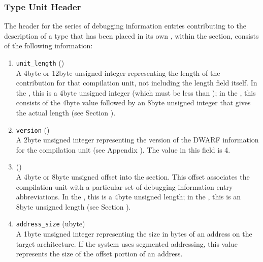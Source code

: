 \subsubsection{Type Unit Header}
\label{datarep:typeunitheader}

The header for the series of debugging information entries
contributing to the description of a type that has been
placed in its own , within the 
\dotdebugtypes{} section,
consists of the following information:
\begin{enumerate}[1. ]

\item \texttt{unit\_length} () \\
A 4\dash byte or 12\dash byte unsigned integer 
representing the length
of the \dotdebugtypes{} contribution for that compilation unit,
not including the length field itself. In the \thirtytwobitdwarfformat, 
this is a 4\dash byte unsigned integer (which must be
less than \xfffffffzero); in the \sixtyfourbitdwarfformat, this
consists of the 4\dash byte value \wffffffff followed by an 
8\dash byte unsigned integer that gives the actual length
(see Section ).

\item  \texttt{version} () \\
A 2\dash byte unsigned integer representing the version of the
DWARF information for the 
compilation unit 
(see Appendix ). 
The value in this field is 4.

\item {} () \\
A 
4\dash byte or 8\dash byte unsigned offset into the 
\dotdebugabbrev{}
section. This offset associates the compilation unit with a
particular set of debugging information entry abbreviations. In
the \thirtytwobitdwarfformat, this is a 4\dash byte unsigned length;
in the \sixtyfourbitdwarfformat, this is an 8\dash byte unsigned length
(see Section ).

\item \texttt{address\_size} (ubyte) \\
A 1\dash byte unsigned integer representing the size 
in bytes of
an address on the target architecture. If the system uses
segmented addressing, this value represents the size of the
offset portion of an address.



\end{enumerate}
